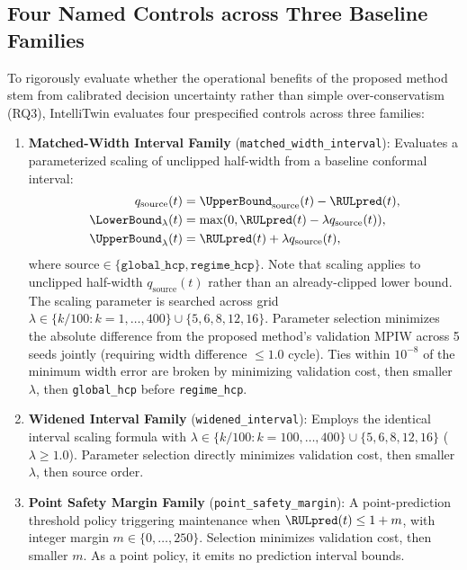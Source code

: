 
\subsection*{Four Named Controls across Three Baseline Families}
To rigorously evaluate whether the operational benefits of the proposed method stem from calibrated decision uncertainty rather than simple over-conservatism (RQ3), IntelliTwin evaluates four prespecified controls across three families:
\begin{enumerate}
    \item \textbf{Matched-Width Interval Family} (\texttt{matched\_width\_interval}): Evaluates a parameterized scaling of unclipped half-width from a baseline conformal interval:
    \begin{align}
    q_{\text{source}}(t) &= \UpperBound_{\text{source}}(t) - \RULpred(t), \\
    \LowerBound_\lambda(t) &= \max(0, \RULpred(t) - \lambda q_{\text{source}}(t)), \\
    \UpperBound_\lambda(t) &= \RULpred(t) + \lambda q_{\text{source}}(t),
    \end{align}
    where $\text{source} \in \{\texttt{global\_hcp}, \texttt{regime\_hcp}\}$. Note that scaling applies to unclipped half-width $q_{\text{source}}(t)$ rather than an already-clipped lower bound. The scaling parameter is searched across grid $\lambda \in \{k/100 : k = 1, \dots, 400\} \cup \{5, 6, 8, 12, 16\}$. Parameter selection minimizes the absolute difference from the proposed method's validation MPIW across 5 seeds jointly (requiring width difference $\le 1.0$ cycle). Ties within $10^{-8}$ of the minimum width error are broken by minimizing validation cost, then smaller $\lambda$, then \texttt{global\_hcp} before \texttt{regime\_hcp}.

    \item \textbf{Widened Interval Family} (\texttt{widened\_interval}): Employs the identical interval scaling formula with $\lambda \in \{k/100 : k = 100, \dots, 400\} \cup \{5, 6, 8, 12, 16\}$ ($\lambda \ge 1.0$). Parameter selection directly minimizes validation cost, then smaller $\lambda$, then source order.

    \item \textbf{Point Safety Margin Family} (\texttt{point\_safety\_margin}): A point-prediction threshold policy triggering maintenance when $\RULpred(t) \le 1 + m$, with integer margin $m \in \{0, \dots, 250\}$. Selection minimizes validation cost, then smaller $m$. As a point policy, it emits no prediction interval bounds.


\end{enumerate}
